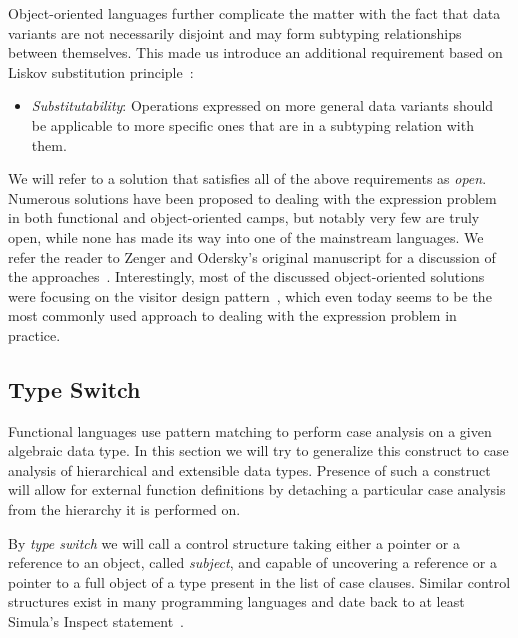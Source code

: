 \noindent
Object-oriented languages further complicate the matter with the fact that 
data variants are not necessarily disjoint and may form subtyping relationships  
between themselves. This made us introduce an additional requirement based on 
Liskov substitution principle~\cite{Lis87}:

\begin{itemize}
\setlength{\itemsep}{0pt}
\setlength{\parskip}{0pt}
\item \emph{Substitutability}: Operations expressed on more general data variants
      should be applicable to more specific ones that are in a subtyping relation 
      with them.
\end{itemize}


\noindent
We will refer to a solution that satisfies all of the above requirements as \emph{open}. 
Numerous solutions have been proposed to dealing with the expression problem in both 
functional and object-oriented camps, but notably very few are truly open, while 
none has made its way into one of the mainstream languages. We refer the reader 
to Zenger and Odersky's original manuscript for a discussion of the 
approaches~\cite{fool12}. Interestingly, most of the discussed object-oriented 
solutions were focusing on the visitor design pattern~\cite{DesignPatterns1993}, 
which even today seems to be the most commonly used approach to dealing with the 
expression problem in practice.

\subsection{Type Switch}

Functional languages use pattern matching to perform case analysis on a given 
algebraic data type. In this section we will try to generalize this construct to 
case analysis of hierarchical and extensible data types. Presence of such a
construct will allow for external function definitions by detaching a particular 
case analysis from the hierarchy it is performed on.

By \emph{type switch} we will call a control structure taking either a pointer 
or a reference to an object, called \emph{subject}, and capable of uncovering a 
reference or a pointer to a full object of a type present in the list of case 
clauses. Similar control structures exist in many programming languages and 
date back to at least Simula's Inspect statement~\cite{Simula67}.

